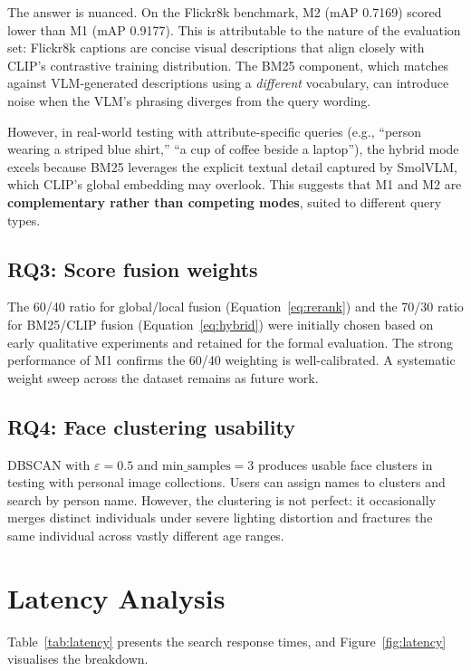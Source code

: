 \documentclass[12pt,a4paper,oneside]{report}
\begin{document}
The answer is nuanced. On the Flickr8k benchmark, M2 (mAP 0.7169) scored lower than M1 (mAP 0.9177). This is attributable to the nature of the evaluation set: Flickr8k captions are concise visual descriptions that align closely with CLIP's contrastive training distribution. The BM25 component, which matches against VLM-generated descriptions using a \emph{different} vocabulary, can introduce noise when the VLM's phrasing diverges from the query wording.

However, in real-world testing with attribute-specific queries (e.g., ``person wearing a striped blue shirt,'' ``a cup of coffee beside a laptop''), the hybrid mode excels because BM25 leverages the explicit textual detail captured by SmolVLM, which CLIP's global embedding may overlook. This suggests that M1 and M2 are \textbf{complementary rather than competing modes}, suited to different query types.

\subsection{RQ3: Score fusion weights}

The 60/40 ratio for global/local fusion (Equation~\ref{eq:rerank}) and the 70/30 ratio for BM25/CLIP fusion (Equation~\ref{eq:hybrid}) were initially chosen based on early qualitative experiments and retained for the formal evaluation. The strong performance of M1 confirms the 60/40 weighting is well-calibrated. A systematic weight sweep across the dataset remains as future work.

\subsection{RQ4: Face clustering usability}

DBSCAN with $\varepsilon = 0.5$ and $\text{min\_samples} = 3$ produces usable face clusters in testing with personal image collections. Users can assign names to clusters and search by person name. However, the clustering is not perfect: it occasionally merges distinct individuals under severe lighting distortion and fractures the same individual across vastly different age ranges.

\section{Latency Analysis}

Table~\ref{tab:latency} presents the search response times, and Figure~\ref{fig:latency} visualises the breakdown.
\end{document}

